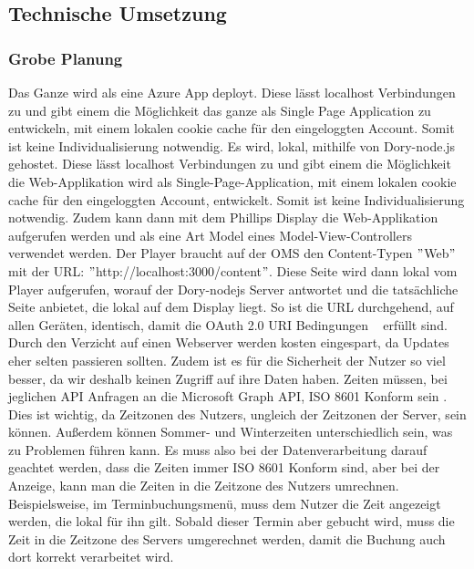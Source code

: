 
\subsection{Technische Umsetzung}\label{subsec:technische-umsetzung}

\subsubsection{Grobe Planung}
Das Ganze wird als eine Azure App deployt.
Diese lässt localhost Verbindungen zu und gibt einem die Möglichkeit das ganze als Single Page Application zu entwickeln, mit einem lokalen cookie cache für den eingeloggten Account.
Somit ist keine Individualisierung notwendig.
\newline
Es wird, lokal, mithilfe von Dory-node.js gehostet.
Diese lässt localhost Verbindungen zu und gibt einem die Möglichkeit die Web-Applikation wird als Single-Page-Application, mit einem lokalen cookie cache für den eingeloggten Account, entwickelt.
Somit ist keine Individualisierung notwendig.
Zudem kann dann mit dem Phillips Display die Web-Applikation aufgerufen werden und als eine Art Model eines Model-View-Controllers verwendet werden.
\newline
Der Player braucht auf der OMS den Content-Typen \("\)Web\("\) mit der URL: \("\)http://localhost:3000/content\("\).
Diese Seite wird dann lokal vom Player aufgerufen, worauf der Dory-nodejs Server antwortet und die tatsächliche Seite anbietet, die lokal auf dem Display liegt.
So ist die URL durchgehend, auf allen Geräten, identisch, damit die OAuth 2.0 URI Bedingungen ~\cite{OAuth-2.0-Simplified} erfüllt sind.
Durch den Verzicht auf einen Webserver werden kosten eingespart, da Updates eher selten passieren sollten.
\newline
Zudem ist es für die Sicherheit der Nutzer so viel besser, da wir deshalb keinen Zugriff auf ihre Daten haben.
Zeiten müssen, bei jeglichen API Anfragen an die Microsoft Graph API, ISO 8601 Konform sein \@.
Dies ist wichtig, da Zeitzonen des Nutzers, ungleich der Zeitzonen der Server, sein können.
Außerdem können Sommer- und Winterzeiten unterschiedlich sein, was zu Problemen führen kann.
Es muss also bei der Datenverarbeitung darauf geachtet werden, dass die Zeiten immer ISO 8601 Konform sind, aber bei der Anzeige, kann man die Zeiten in die Zeitzone des Nutzers umrechnen.
Beispielsweise, im Terminbuchungsmenü, muss dem Nutzer die Zeit angezeigt werden, die lokal für ihn gilt.
Sobald dieser Termin aber gebucht wird, muss die Zeit in die Zeitzone des Servers umgerechnet werden, damit die Buchung auch dort korrekt verarbeitet wird.
\newline
\pagebreak
